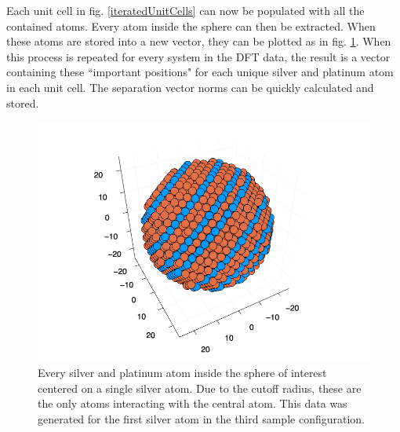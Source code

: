\par Each unit cell in fig. \ref{iteratedUnitCells} can now be populated with all the contained atoms. Every atom inside the sphere can then be extracted. When these atoms are stored into a new vector, they can be plotted as in fig. \ref{plotAgAtomSphere}. When this process is repeated for every system in the DFT data, the result is a vector containing these ``important positions" for each unique silver and platinum atom in each unit cell. The separation vector norms can be quickly calculated and stored.

\begin{figure}%
\centering
\includegraphics[scale = 0.85]{Figures/plotAgAtomSphere(3,1)}
\caption{Every silver and platinum atom inside the sphere of interest centered on a single silver atom. Due to the cutoff radius, these are the only atoms interacting with the central atom. This data was generated for the first silver atom in the third sample configuration. 
\label{plotAgAtomSphere}} 
\end{figure}

